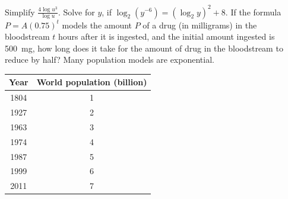 \begin{questions}
  \question Simplify $ \frac{4\log u^3}{\log u} $.
  \question Solve for $ y $, if $ \log_2 (y^{-6}) = (\log_2 y)^2 + 8 $.
  \question If the formula $ P = A(0.75)^t $ models the amount $ P $ of a drug (in milligrams) in the bloodstream $ t $ hours after it
            is ingested, and the initial amount ingested is \SI{500}{\milli\gram}, how long does it take for the amount of drug in the
            bloodstream to reduce by half?
  \question Many population models are exponential.
            \begin{center}
              \begin{tabular}{|c|c|}\hline
                \textbf{Year} & \textbf{World population (billion)}\\\hline
                1804 & 1\\\hline
                1927 & 2\\\hline
                1963 & 3\\\hline
                1974 & 4\\\hline
                1987 & 5\\\hline
                1999 & 6\\\hline
                2011 & 7\\\hline
              \end{tabular}
            \end{center}
\end{questions}

